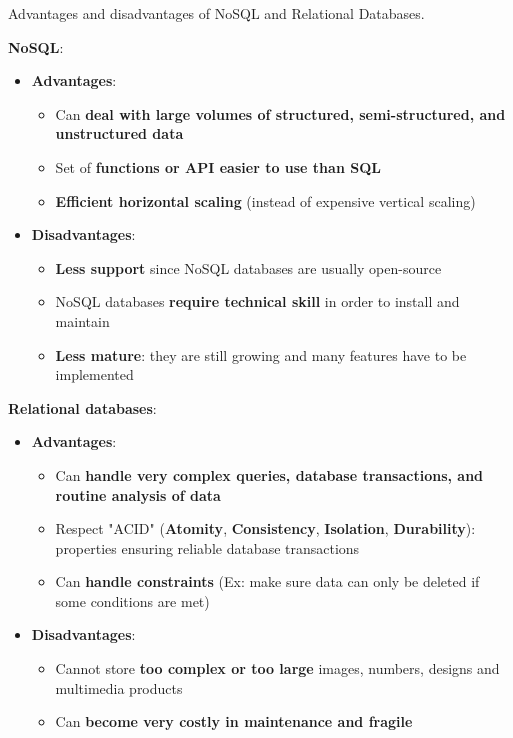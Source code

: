 \documentclass{beamer}[10pt, usepdftitle=false handout]
\begin{document}
	\begin{frame}
	
	Advantages and disadvantages of NoSQL and Relational Databases.
	\vspace*{0.6em}

	\textbf{NoSQL}:
	\vspace*{0.6em}

   \begin{itemize}
    \item{\textbf{Advantages}:
    \begin{itemize}
		\item{Can \textbf{deal with large volumes of structured, semi-structured, and unstructured data}}
		\item{Set of \textbf{functions or API easier to use than SQL}}
		\item{\textbf{Efficient horizontal scaling} (instead of expensive vertical scaling)}      
    \end{itemize}
    }
    \item{\textbf{Disadvantages}:
    \begin{itemize}
    	\item{\textbf{Less support} since NoSQL databases are usually open-source}
    	\item{NoSQL databases \textbf{require technical skill} in order to install and maintain}
    	\item{\textbf{Less mature}: they are still growing and many features have to be implemented}
    \end{itemize}
	}
	\end{itemize}	
	\end{frame}
	
	\begin{frame}
	\textbf{Relational databases}:
	\vspace*{0.6em}

	\begin{itemize}
		\item{\textbf{Advantages}:
			\begin{itemize}
				\item{Can \textbf{handle very complex queries, database transactions, and routine analysis of data}}
				\item{Respect "ACID" (\textbf{Atomity}, \textbf{Consistency}, \textbf{Isolation}, \textbf{Durability}): properties ensuring reliable database transactions}
				\item{Can \textbf{handle constraints} (Ex: make sure data can only be deleted if some conditions are met)}
			\end{itemize} 
			}
		\item{\textbf{Disadvantages}:
			\begin{itemize}
				\item{Cannot store \textbf{too complex or too large} images, numbers, designs and multimedia products}
				\item{Can \textbf{become very costly in maintenance and fragile}}
			\end{itemize}				
  	}
	\end{itemize}

	\end{frame}		
\end{document}
